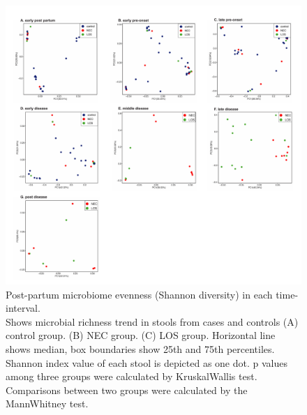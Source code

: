 \documentclass[fleqn,10pt]{wlpeerj} %
\begin{document}
\begin{figure}[ht]\centering
  \includegraphics[width=\linewidth]{pcoa_time_group.pdf}
  \caption{Post-partum microbiome evenness (Shannon diversity) in each time-interval. \\ Shows microbial richness trend in stools from cases and controls (A) control group. (B) NEC group. (C) LOS group. Horizontal line shows median, box boundaries show 25th and 75th percentiles.  Shannon index value of each stool is depicted as one dot. p values among three groups were calculated by Kruskal\-Wallis test. Comparisons between two groups were calculated by the Mann\-Whitney test. }
  \label{fig:pcoa}
\end{figure}
\end{document}
